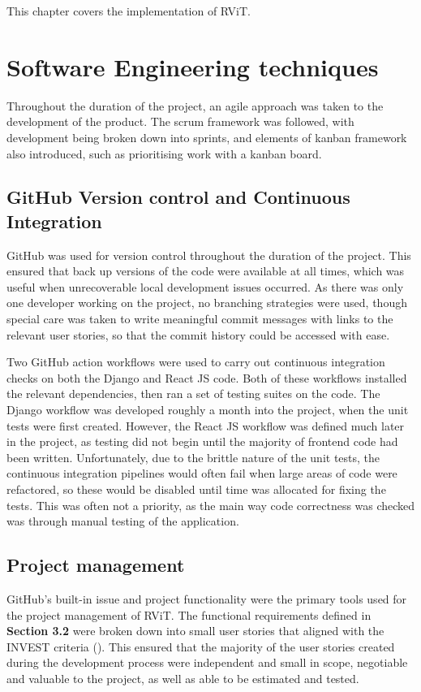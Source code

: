 \documentclass[l4proj.tex]{subfiles}
\begin{document}
    

This chapter covers the implementation of RViT. 

\section{Software Engineering techniques}
Throughout the duration of the project, an agile approach was taken to the development of the product. The scrum framework was followed, with development being broken down into sprints, and elements of kanban framework also introduced, such as prioritising work with a kanban board.


\subsection{GitHub Version control and Continuous Integration}
GitHub was used for version control throughout the duration of the project. This ensured that back up versions of the code were available at all times, which was useful when unrecoverable local development issues occurred. As there was only one developer working on the project, no branching strategies were used, though special care was taken to write meaningful commit messages with links to the relevant user stories, so that the commit history could be accessed with ease. 

Two GitHub action workflows were used to carry out continuous integration checks on both the Django and React JS code. Both of these workflows installed the relevant dependencies, then ran a set of testing suites on the code. The Django workflow was developed roughly a month into the project, when the unit tests were first created. However, the React JS workflow was defined much later in the project, as testing did not begin until the majority of frontend code had been written. Unfortunately, due to the brittle nature of the unit tests, the continuous integration pipelines would often fail when large areas of code were refactored, so these would be disabled until time was allocated for fixing the tests. This was often not a priority, as the main way code correctness was checked was through manual testing of the application.

\subsection{Project management}
GitHub's built-in issue and project functionality were the primary tools used for the project management of RViT. The functional requirements defined in \textbf{Section 3.2} were broken down into small user stories that aligned with the INVEST criteria (\cite{Buglione2013}). This ensured that the majority of the user stories created during the development process were independent and small in scope, negotiable and valuable to the project, as well as able to be estimated and tested. 
\end{document}
